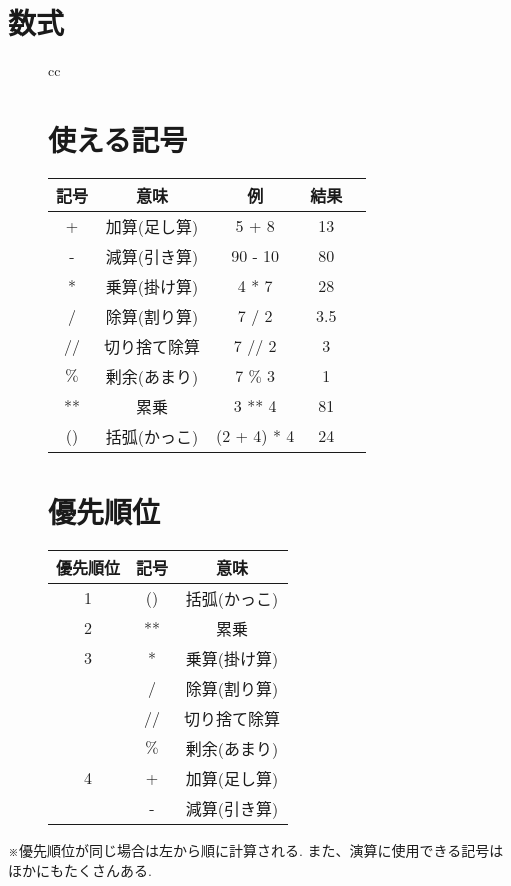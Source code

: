 \documentclass[dvipdfmx]{jsbook}
\begin{document}
\section*{数式}
\begin{figure}[htp]
	\begin{tabular}{cc}
		\begin{minipage}{.4\textwidth}
			\section{使える記号}
			\begin{tabular}[t]{|c|c|c|c|c|}
				\hline
				記号 & 意味         & 例          & 結果 \\
				\hline \hline
				+    & 加算(足し算) & 5 + 8       & 13   \\ \hline
				-    & 減算(引き算) & 90 - 10     & 80   \\ \hline
				*    & 乗算(掛け算) & 4 * 7       & 28   \\ \hline
				/    & 除算(割り算) & 7 / 2       & 3.5  \\ \hline
				//   & 切り捨て除算 & 7 // 2      & 3    \\ \hline
				$\%$ & 剰余(あまり) & 7 $\%$ 3    & 1    \\ \hline
				**   & 累乗         & 3 ** 4      & 81   \\ \hline
				()   & 括弧(かっこ) & (2 + 4) * 4 & 24   \\ \hline
			\end{tabular}
		\end{minipage} \hspace{20truemm}
		\begin{minipage}{.4\textwidth}
			\section{優先順位}
			\begin{tabular}[t]{|c|c|c|}
				\hline
				優先順位 & 記号 & 意味         \\
				\hline \hline
				1        & ()   & 括弧(かっこ) \\ \hline
				2        & **   & 累乗         \\ \hline
				3        & *    & 乗算(掛け算) \\ \hline
				         & /    & 除算(割り算) \\ \hline
				         & //   & 切り捨て除算 \\ \hline
				         & $\%$ & 剰余(あまり) \\ \hline
				4        & +    & 加算(足し算) \\ \hline
				         & -    & 減算(引き算) \\ \hline
			\end{tabular}
		\end{minipage}
	\end{tabular}
\end{figure}
※優先順位が同じ場合は左から順に計算される. また、演算に使用できる記号はほかにもたくさんある.
\end{document}
